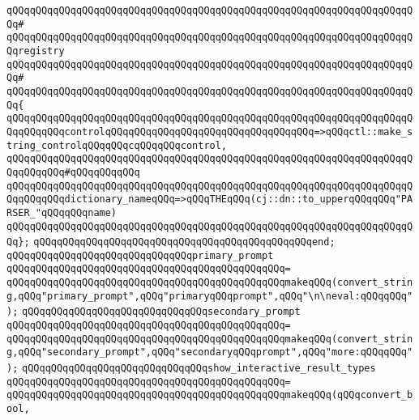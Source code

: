 \verb|qQQqqQQqqQQqqQQqqQQqqQQqqQQqqQQqqQQqqQQqqQQqqQQqqQQqqQQqqQQqqQQqqQQqqQQq#|\newline
\verb|qQQqqQQqqQQqqQQqqQQqqQQqqQQqqQQqqQQqqQQqqQQqqQQqqQQqqQQqqQQqqQQqqQQqqQQqregistry|\newline
\verb|qQQqqQQqqQQqqQQqqQQqqQQqqQQqqQQqqQQqqQQqqQQqqQQqqQQqqQQqqQQqqQQqqQQqqQQq#|\newline
\verb|qQQqqQQqqQQqqQQqqQQqqQQqqQQqqQQqqQQqqQQqqQQqqQQqqQQqqQQqqQQqqQQqqQQqqQQq{|\newline
\verb|qQQqqQQqqQQqqQQqqQQqqQQqqQQqqQQqqQQqqQQqqQQqqQQqqQQqqQQqqQQqqQQqqQQqqQQqqQQqqQQqcontrolqQQqqQQqqQQqqQQqqQQqqQQqqQQqqQQqqQQq=>qQQqctl::make_string_controlqQQqqQQqcqQQqqQQqcontrol,|\newline
\verb|qQQqqQQqqQQqqQQqqQQqqQQqqQQqqQQqqQQqqQQqqQQqqQQqqQQqqQQqqQQqqQQqqQQqqQQqqQQqqQQq#qQQqqQQqqQQq|\newline
\verb|qQQqqQQqqQQqqQQqqQQqqQQqqQQqqQQqqQQqqQQqqQQqqQQqqQQqqQQqqQQqqQQqqQQqqQQqqQQqqQQqdictionary_nameqQQq=>qQQqTHEqQQq(cj::dn::to_upperqQQqqQQq"PARSER_"qQQqqQQqname)|\newline
\verb|qQQqqQQqqQQqqQQqqQQqqQQqqQQqqQQqqQQqqQQqqQQqqQQqqQQqqQQqqQQqqQQqqQQqqQQq};|\newline
\verb|qQQqqQQqqQQqqQQqqQQqqQQqqQQqqQQqqQQqqQQqqQQqqQQqend;|\newline
\newline
\newline
\verb|qQQqqQQqqQQqqQQqqQQqqQQqqQQqqQQqprimary_prompt|\newline
\verb|qQQqqQQqqQQqqQQqqQQqqQQqqQQqqQQqqQQqqQQqqQQqqQQq=|\newline
\verb|qQQqqQQqqQQqqQQqqQQqqQQqqQQqqQQqqQQqqQQqqQQqqQQqmakeqQQq(convert_string,qQQq"primary_prompt",qQQq"primaryqQQqprompt",qQQq"\n\neval:qQQqqQQq");|\newline
\newline
\verb|qQQqqQQqqQQqqQQqqQQqqQQqqQQqqQQqsecondary_prompt|\newline
\verb|qQQqqQQqqQQqqQQqqQQqqQQqqQQqqQQqqQQqqQQqqQQqqQQq=|\newline
\verb|qQQqqQQqqQQqqQQqqQQqqQQqqQQqqQQqqQQqqQQqqQQqqQQqmakeqQQq(convert_string,qQQq"secondary_prompt",qQQq"secondaryqQQqprompt",qQQq"more:qQQqqQQq");|\newline
\newline
\verb|qQQqqQQqqQQqqQQqqQQqqQQqqQQqqQQqshow_interactive_result_types|\newline
\verb|qQQqqQQqqQQqqQQqqQQqqQQqqQQqqQQqqQQqqQQqqQQqqQQq=|\newline
\verb|qQQqqQQqqQQqqQQqqQQqqQQqqQQqqQQqqQQqqQQqqQQqqQQqmakeqQQq(qQQqconvert_bool,|\newline
